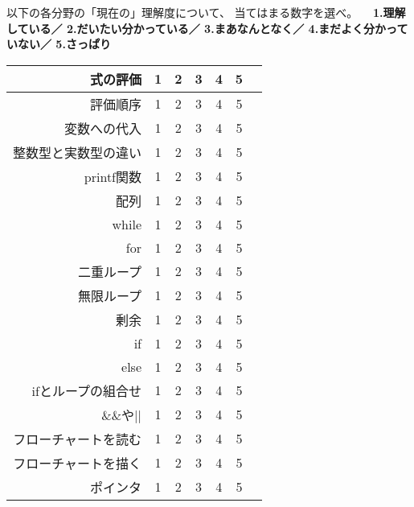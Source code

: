
\def\nums{\hfill 1&2&3&4&5}

\toi
以下の各分野の「現在の」理解度について、
当てはまる数字を選べ。
　{\bfseries\footnotesize 1.理解している／
2.だいたい分かっている／
3.まあなんとなく／
4.まだよく分かっていない／
5.さっぱり}
\begin{center}\small
 \begin{tabular}{|r||c|c|c|c|c|c|}\hline
 式の評価&\nums\\\hline
 評価順序&\nums\\\hline
 変数への代入&\nums\\\hline
 整数型と実数型の違い&\nums\\\hline
 {\ttfamily printf}関数&\nums\\\hline
 配列&\nums\\\hline
 {\ttfamily while}&\nums\\\hline
 {\ttfamily for}&\nums\\\hline
 二重ループ&\nums\\\hline
 無限ループ&\nums\\\hline
 剰余&\nums\\\hline
 {\ttfamily if}&\nums\\\hline
 {\ttfamily else}&\nums\\\hline
 {\ttfamily if}とループの組合せ&\nums\\\hline
 {\ttfamily \&\&}や{\ttfamily ||}&\nums\\\hline
 フローチャートを読む&\nums\\\hline
 フローチャートを描く&\nums\\\hline
 ポインタ&\nums\\\hline
 \end{tabular}
\end{center}


